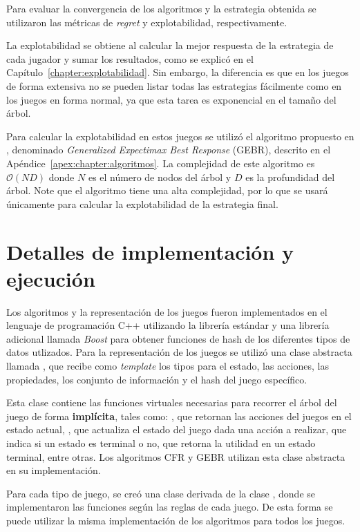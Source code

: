 Para evaluar la convergencia de los algoritmos y la estrategia obtenida se utilizaron las métricas de \textit{regret} y explotabilidad, respectivamente.

La explotabilidad se obtiene al calcular la mejor respuesta de la estrategia de cada jugador y sumar los resultados, como se explicó en el Capítulo~\ref{chapter:explotabilidad}. Sin embargo, la diferencia es que en los juegos de forma extensiva no se pueden listar todas las estrategias fácilmente como en los juegos en forma normal, ya que esta tarea es exponencial en el tamaño del árbol.

Para calcular la explotabilidad en estos juegos se utilizó el algoritmo propuesto en \cite{bib:thesis-marc-lanctot}, denominado \textit{Generalized Expectimax Best Response} (GEBR), descrito en el Apéndice~\ref{apex:chapter:algoritmos}. La complejidad de este algoritmo es $\mathcal{O}(ND)$ donde $N$ es el número de nodos del árbol y $D$ es la profundidad del árbol. Note que el algoritmo tiene una alta complejidad, por lo que se usará únicamente para calcular la explotabilidad de la estrategia final.

\section{Detalles de implementación y ejecución}

Los algoritmos y la representación de los juegos fueron implementados en el lenguaje de programación C++ utilizando la librería estándar y una librería adicional llamada \textit{Boost} \cite{bib:boost} para obtener funciones de hash de los diferentes tipos de datos utlizados. Para la representación de los juegos se utilizó una clase abstracta llamada , que recibe como \textit{template} los tipos para el estado, las acciones, las propiedades, los conjunto de información y el hash del juego específico.

Esta clase contiene las funciones virtuales necesarias para recorrer el árbol del juego de forma \textbf{implícita}, tales como: , que retornan las acciones del juegos en el estado actual, , que actualiza el estado del juego dada una acción a realizar,  que indica si un estado es terminal o no,  que retorna la utilidad en un estado terminal, entre otras. Los algoritmos CFR y GEBR utilizan esta clase abstracta en su implementación.

Para cada tipo de juego, se creó una clase derivada de la clase , donde se implementaron las funciones según las reglas de cada juego. De esta forma se puede utilizar la misma implementación de los algoritmos para todos los juegos.

